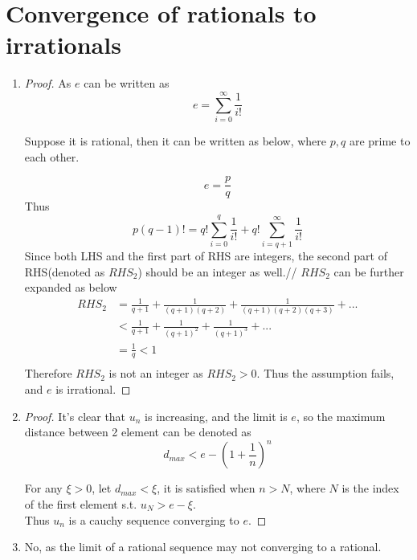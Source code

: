 \documentclass[paper=a4, fontsize=11pt]{scrartcl} %
\numberwithin{equation}{section} %
\numberwithin{figure}{section} %
\numberwithin{table}{section} %
\begin{document}
\section{Convergence of rationals to irrationals}
	\begin{enumerate}
		\item
			\begin{proof}
				As $e$ can be written as 
				\begin{equation}
					e = \sum_{i=0}^{\infty} \frac{1}{i!}
				\end{equation}
				
				Suppose it is rational, then it can be written as below, where $p, q$ are prime to each other.
				
				\begin{equation}
					e = \frac{p}{q} 
				\end{equation}
				Thus
				\begin{equation}
					p(q-1)! = q! \sum_{i=0}^{q} \frac{1}{i!} +  q! \sum_{i=q+1}^{\infty} \frac{1}{i!} 
				\end{equation}
				Since both LHS  and  the first part of RHS are integers, the second part of RHS(denoted as $RHS_2$) should be an integer as well.//
				$RHS_2$ can be further expanded as below
				\begin{equation}
					\begin{aligned}
						RHS_2 & = \frac{1}{q+1} + \frac{1}{(q+1)(q+2)} + \frac{1}{(q+1)(q+2)(q+3)} + ...\\
						           & <  \frac{1}{q+1} + \frac{1}{(q+1)^2} + \frac{1}{(q+1)^3} + ...\\
						           & = \frac{1}{q} < 1 \\
					\end{aligned}
				\end{equation}
				Therefore $RHS_2$ is not an integer as $RHS_2 > 0$. Thus the assumption fails, and $e$  is irrational.
			\end{proof}
	
		\item
			\begin{proof}
				It's clear that $u_n$ is increasing, and the limit is $e$, so the maximum distance between 2 element can be denoted as 
				\begin{equation}
					d_{max} < e - (1+\frac{1}{n})^n
				\end{equation} 
				
				For any $\xi > 0$, let $d_{max} < \xi$, it is satisfied when $n > N $, where $N$ is the index of the first element s.t. $u_N > e-\xi$.\\
				Thus $u_n$ is a cauchy sequence converging to $e$.
			\end{proof}
		
		\item
			No, as the limit of a rational sequence may not converging to a rational.
	\end{enumerate}
\end{document}

